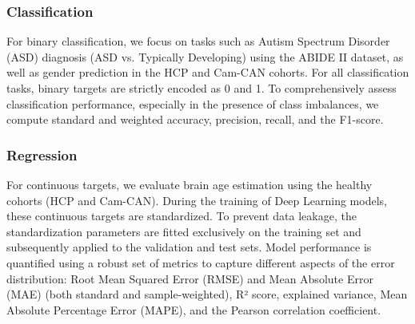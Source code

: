 \subsubsection{Classification} 
For binary classification, we focus on tasks such as Autism Spectrum Disorder (ASD) diagnosis (ASD vs. 
Typically Developing) using the ABIDE II dataset, as well as gender prediction in the HCP and Cam-CAN 
cohorts. For all classification tasks, binary targets are strictly encoded as 0 and 1. To comprehensively 
assess classification performance, especially in the presence of class imbalances, we compute standard 
and weighted accuracy, precision, recall, and the F1-score.



\subsubsection{Regression} 
For continuous targets, we evaluate brain age estimation using the healthy cohorts (HCP and Cam-CAN). 
During the training of Deep Learning models, these continuous targets are standardized. To prevent data leakage, 
the standardization parameters are fitted exclusively on the training set and subsequently applied to the 
validation and test sets. Model performance is quantified using a robust set of metrics to capture 
different aspects of the error distribution: Root Mean Squared Error (RMSE) and Mean Absolute Error (MAE) 
(both standard and sample-weighted), R² score, explained variance, Mean Absolute Percentage Error (MAPE), 
and the Pearson correlation coefficient.


